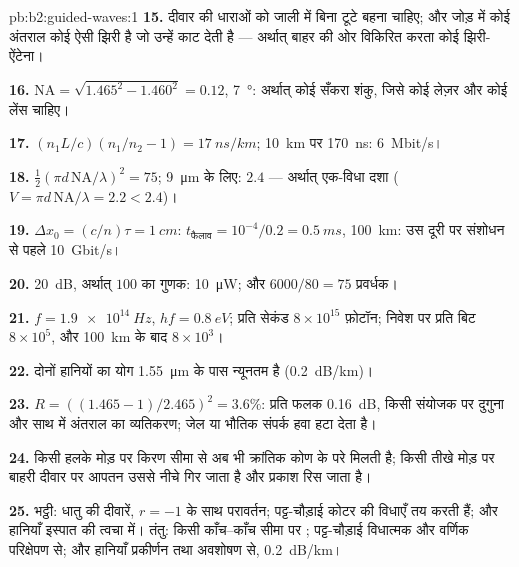 \begin{solution}{pb:b2:guided-waves:1}
\textbf{15.} दीवार की धाराओं को जाली में बिना टूटे बहना चाहिए;
और जोड़ में कोई अंतराल कोई ऐसी झिरी है जो उन्हें काट देती है --- अर्थात् बाहर
की ओर विकिरित करता कोई झिरी-ऐंटेना।

\textbf{16.} $\mathrm{NA} = \sqrt{1.465^2 - 1.460^2} = 0.12$, \qty{7}{\degree}: अर्थात् कोई सँकरा
शंकु, जिसे कोई लेज़र और कोई लेंस चाहिए।

\textbf{17.} $(n_1L/c)(n_1/n_2 - 1) = \qty{17}{ns/km}$; \qty{10}{km} पर \qty{170}{ns}:
\qty{6}{Mbit/s}।

\textbf{18.} $\tfrac12(\pi d\,\mathrm{NA}/\lambda)^2 = 75$; \qty{9}{\micro m} के लिए: $2.4$ --- अर्थात्
एक-विधा दशा ($V = \pi d\,\mathrm{NA}/\lambda = 2.2 < 2.4$)।

\textbf{19.} $\Delta x_0 = (c/n)\tau = \qty{1}{cm}$: $t_{\text{फैलाव}} = 10^{-4}/0.2 = \qty{0.5}{ms}$,
\qty{100}{km}: उस दूरी पर संशोधन से पहले \qty{10}{Gbit/s}।

\textbf{20.} \qty{20}{dB}, अर्थात् $100$ का गुणक: \qty{10}{\micro W}; और $6000/80 = 75$
प्रवर्धक।

\textbf{21.} $f = \qty{1.9e14}{Hz}$, $hf = \qty{0.8}{eV}$; प्रति सेकंड $8 \times 10^{15}$
फ़ोटॉन; निवेश पर प्रति बिट $8 \times 10^5$, और \qty{100}{km} के बाद $8 \times 10^3$।

\textbf{22.} दोनों हानियों का योग \qty{1.55}{\micro m} के पास न्यूनतम है
(\qty{0.2}{dB/km})।

\textbf{23.} $R = ((1.465 - 1)/2.465)^2 = 3.6\%$: प्रति फलक \qty{0.16}{dB}, किसी संयोजक पर
दुगुना और साथ में अंतराल का व्यतिकरण; जेल या भौतिक संपर्क
हवा हटा देता है।

\textbf{24.} किसी हलके मोड़ पर किरण सीमा से अब भी क्रांतिक कोण के परे
मिलती है; किसी तीखे मोड़ पर बाहरी दीवार पर आपतन उससे नीचे
गिर जाता है और प्रकाश रिस जाता है।

\textbf{25.} भट्ठी: धातु की दीवारें, $r = -1$ के साथ परावर्तन; पट्ट-चौड़ाई
कोटर की विधाएँ तय करती हैं; और हानियाँ इस्पात की त्वचा में। तंतु: किसी
काँच--काँच सीमा पर ; पट्ट-चौड़ाई विधात्मक और
वर्णिक परिक्षेपण से; और हानियाँ प्रकीर्णन तथा अवशोषण से, \qty{0.2}{dB/km}।
\end{solution}
